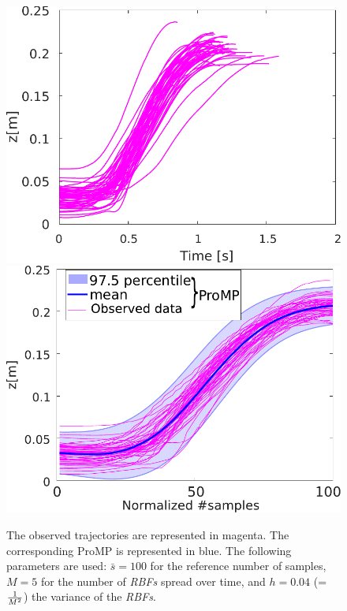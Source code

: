 \documentclass[utf8]{frontiersSCNS} %
\begin{document}
\begin{figure}[h]
\includegraphics[width=\hsize /2]{img/1DOFtrajectoriesV2.pdf} \includegraphics[width=\hsize /2]{img/1DOFtrajectoriesProMPV2.pdf}
\caption{The observed trajectories are represented in magenta. The corresponding ProMP is represented in blue. The following parameters are used: $\bar{s}=100$ for the reference number of samples, $M=5$ for the number of \textit{RBFs} spread over time, and  $h=0.04$ (=$ 1 \over M^2$) the variance of the \textit{RBFs}.}
\label{fig:1DOFtrajectoriesProMP}
\end{figure}

\end{document}
